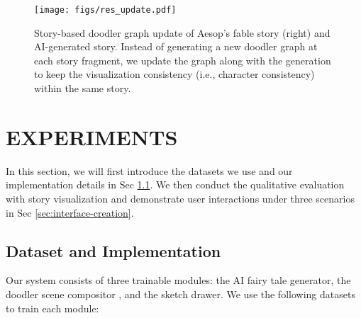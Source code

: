 \begin{figure*}[!htb]
\begin{center}
  \texttt{[image: figs/res\_update.pdf]}
\end{center}
\caption{Story-based doodler graph update of Aesop's fable story (right) and AI-generated story. Instead of generating a new doodler graph at each story fragment, we update the graph along with the generation to keep the visualization consistency (i.e., character consistency) within the same story.}
\label{fig:res_update}
\end{figure*}

\section{EXPERIMENTS}
\label{sec:expr}

In this section, we will first introduce the datasets we use and our implementation details in Sec \ref{sec:dataset-implementation}. We then conduct the qualitative evaluation with story visualization and demonstrate user interactions under three scenarios in Sec \ref{sec:interface-creation}.

\subsection{Dataset and Implementation} \label{sec:dataset-implementation}

Our system consists of three trainable modules: the AI fairy tale generator, the doodler scene compositor , and the sketch drawer. We use the following datasets to train each module:

